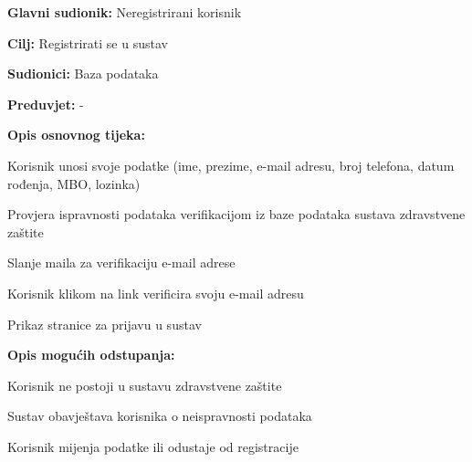				\noindent {}
				\begin{packed_item}
					
					\item \textbf{Glavni sudionik: }Neregistrirani korisnik
					\item  \textbf{Cilj: }Registrirati se u sustav
					\item  \textbf{Sudionici: }Baza podataka
					\item  \textbf{Preduvjet: } -  
					\item  \textbf{Opis osnovnog tijeka: }
					
					\item[] \begin{packed_enum}
						
						\item Korisnik unosi svoje podatke (ime, prezime, e-mail adresu, broj telefona, datum rođenja, MBO, lozinka)
						\item Provjera ispravnosti podataka verifikacijom iz baze podataka sustava zdravstvene zaštite
						\item Slanje maila za verifikaciju e-mail adrese
						\item Korisnik klikom na link verificira svoju e-mail adresu
						\item Prikaz stranice za prijavu u sustav
					\end{packed_enum}
					
					\item  \textbf{Opis mogućih odstupanja:}
					
					\item[] \begin{packed_item}
						
						\item[2.a] Korisnik ne postoji u sustavu zdravstvene zaštite
						\item[] \begin{packed_enum}
							
							\item Sustav obavještava korisnika o neispravnosti podataka
							\item Korisnik mijenja podatke ili odustaje od registracije
							
						\end{packed_enum}
						
					\end{packed_item}
				\end{packed_item}
				
